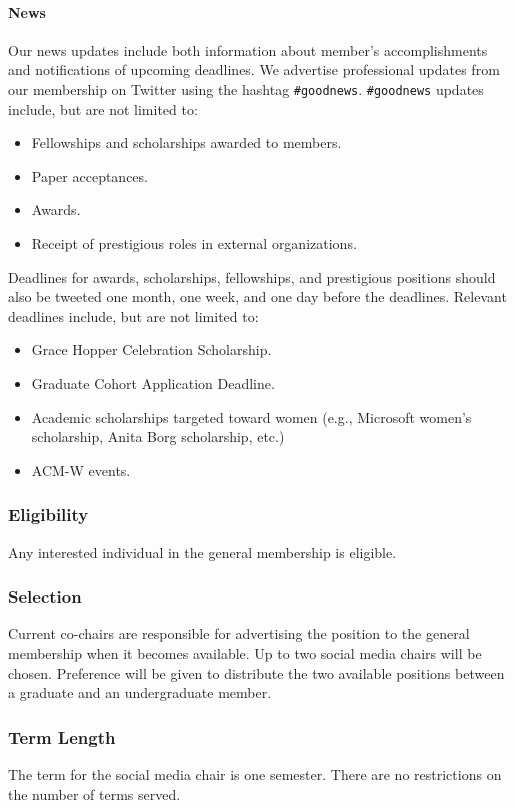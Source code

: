 \paragraph{News} Our news updates include both information about member's accomplishments and notifications of upcoming deadlines. We advertise professional updates from our membership on Twitter using the hashtag \verb|#goodnews|. \verb|#goodnews| updates include, but are not limited to:
	\begin{itemize}
	\item Fellowships and scholarships awarded to members.
	\item Paper acceptances.
	\item Awards.
	\item Receipt of prestigious roles in external organizations.
	\end{itemize}
	Deadlines for awards, scholarships, fellowships, and prestigious positions should also be tweeted one month, one week, and one day before the deadlines. Relevant deadlines include, but are not limited to:
\begin{itemize}
	\item Grace Hopper Celebration Scholarship.
	\item Graduate Cohort Application Deadline.
	\item Academic scholarships targeted toward women (e.g., Microsoft women's scholarship, Anita Borg scholarship, etc.)
	\item ACM-W events.
\end{itemize}


\subsubsection{Eligibility}
\label{sec:socialmedia_eligibility}
Any interested individual in the general membership is eligible. 

\subsubsection{Selection}
\label{sec:socialmedia_selection}
Current co-chairs are responsible for advertising the position to the general membership when it becomes available. Up to two social media chairs will be chosen. Preference will be given to distribute the two available positions between a graduate and an undergraduate member.


\subsubsection{Term Length}
\label{sec:socialmedia_termlength}
The term for the social media chair is one semester. There are no restrictions on the number of terms served.
